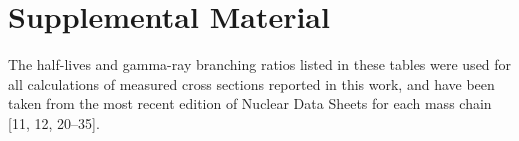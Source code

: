 \documentclass[a4paper,10pt]{article}
\title{}
\author{}
\begin{document}

% 


\section{Supplemental Material} \label{fe_supp_material}
% 
The   half-lives and gamma-ray branching ratios  listed in these tables were used for all calculations of measured cross sections reported in this work, and have been taken from the most recent edition of  Nuclear Data Sheets for each  mass chain  [11, 12, 20--35].
\end{document}

